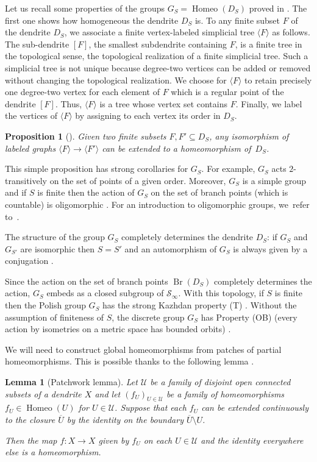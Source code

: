 \documentclass[JEP,XML,SOM,Unicode,NoFloatCountersInSection]{cedram}
\let\mathcal\mathscr
\theoremstyle{plain}
\newtheorem{lem}[thm]{Lemma}
\newtheorem{prop}[thm]{Proposition}
\theoremstyle{definition}
\newcommand{\sU}{\mathscr{U}}
\newcommand{\cS}{\mathcal{S}}
\newcommand{\sinf}{\cS_\infty}
\let\se\subseteq
\DeclareMathOperator{\Homeo}{Homeo}
\DeclareMathOperator{\Br}{Br}
\begin{document}
Let us recall some properties of the groups $G_S=\Homeo(D_S)$ proved in \cite[\S\S 6\,\&\,7]{DM_dendritesII}. The first one shows how homogeneous the dendrite $D_S$ is.
To any finite subset $F$ of the dendrite $D_S$, we associate a finite vertex-labeled simplicial tree $\langle F \rangle$ as follows. The sub-dendrite $[F]$, \ie the smallest subdendrite containing $F$, is a finite tree in the topological sense, \ie the topological realization of a finite simplicial tree. Such a simplicial tree is not unique because degree-two vertices can be added or removed without changing the topological realization. We choose for $\langle F \rangle$ to retain precisely one degree-two vertex for each element of $F$ which is a regular point of the dendrite $[F]$. Thus, $\langle F \rangle$ is a tree whose vertex set contains $F$. Finally, we label the vertices of $\langle F\rangle$ by assigning to each vertex its order in $D_S$.

\begin{prop}[{\cite[Prop.\,6.1]{DM_dendritesII}}]\label{prop:extension}
Given two finite subsets $F, F'\se D_S$, any isomorphism of labeled graphs $\langle F \rangle\to \langle F' \rangle$ can be extended to a homeomorphism of~$D_S$.
\end{prop}

This simple proposition has strong corollaries for $G_S$. For example, $G_S$ acts $2$\nobreakdash-transitively on the set of points of a given order. Moreover, $G_S$ is a simple group and if $S$ is finite then the action of $G_S$ on the set of branch points (which is countable) is oligomorphic \cite[Cor.\,6.7]{DM_dendritesII}. For an introduction to oligomorphic groups, we~refer to~\cite{MR2581750}.

The structure of the group $G_S$ completely determines the dendrite $D_S$: if $G_S$ and~$G_{S'}$ are isomorphic then $S=S'$ and an automorphism of $G_S$ is always given by a conjugation \cite[Cor.\,7.4 \& 7.5]{DM_dendritesII}.

Since the action on the set of branch points $\Br(D_S)$ completely determines the action, $G_S$ embeds as a closed subgroup of $\sinf$. With this topology, if $S$ is finite then the Polish group $G_S$ has the strong Kazhdan property (T) \cite[Cor.\,6.9]{DM_dendritesII}. Without the assumption of finiteness of $S$, the discrete group $G_S$ has Property (OB) (every action by isometries on a metric space has bounded orbits) \cite[Cor.\,6.12]{DM_dendritesII}. 

We will need to construct global homeomorphisms from patches of partial homeomorphisms. This is possible thanks to the following lemma \cite[Lem.\,2.9]{DM_dendritesII}.
\begin{lem}[Patchwork lemma]\label{lem:patchwork}
Let $\sU$ be a family of disjoint open connected subsets of a dendrite $X$ and let $(f_U)_{U\in \sU}$ be a family of homeomorphisms $f_U \in\Homeo(U)$ for $U\in\sU$. Suppose that each $f_U$ can be extended continuously to the closure $\overline U$ by the identity on the boundary $\overline U\setminus U$.

Then the map $f\colon X\to X$ given by $f_U$ on each $U\in \sU$ and the identity everywhere else is a homeomorphism.
\end{lem}
\end{document}
